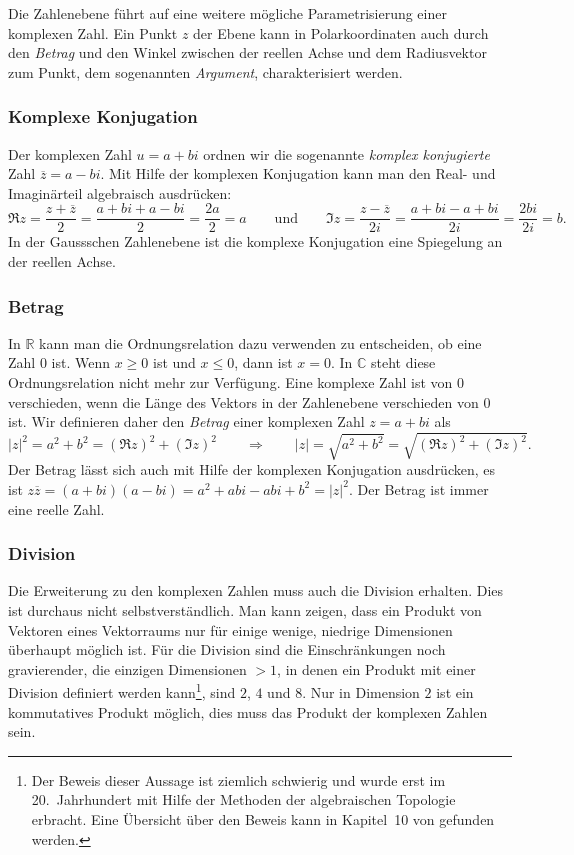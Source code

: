 Die Zahlenebene führt auf eine weitere mögliche Parametrisierung einer
komplexen Zahl.
Ein Punkt $z$ der Ebene kann in Polarkoordinaten auch durch den {\em Betrag}
%
%
und den Winkel zwischen der reellen Achse und dem Radiusvektor zum Punkt,
dem sogenannten {\em Argument},
charakterisiert werden.

\subsubsection{Komplexe Konjugation}
Der komplexen Zahl $u=a+bi$ ordnen wir die sogenannte
{\em komplex konjugierte} Zahl $\overline{z} = a-bi$.
Mit Hilfe der komplexen Konjugation kann man den Real- und Imaginärteil
%
%
algebraisch ausdrücken:
\[
\Re z 
=
\frac{z+\overline{z}}2
=
\frac{a+bi+a-bi}{2}
=
\frac{2a}2
=a
\qquad\text{und}\qquad
\Im z
=
\frac{z-\overline{z}}{2i}
=
\frac{a+bi-a+bi}{2i}
=
\frac{2bi}{2i}
=
b.
\]
In der Gaussschen Zahlenebene ist die komplexe Konjugation eine
Spiegelung an der reellen Achse.

\subsubsection{Betrag}
In $\mathbb{R}$ kann man die Ordnungsrelation dazu verwenden zu entscheiden,
ob eine Zahl $0$ ist. 
Wenn $x\ge 0$ ist und $x\le 0$, dann ist $x=0$.
In $\mathbb{C}$ steht diese Ordnungsrelation nicht mehr zur Verfügung.
Eine komplexe Zahl ist von $0$ verschieden, wenn die Länge des Vektors in der
Zahlenebene verschieden von $0$ ist.
Wir definieren daher den {\em Betrag} einer komplexen Zahl $z=a+bi$ als
\[
|z|^2
=
a^2 +b^2
=
(\Re z)^2 + (\Im z)^2
\qquad\Rightarrow\qquad
|z|
=
\sqrt{a^2+b^2}
=
\sqrt{(\Re z)^2 + (\Im z)^2}.
\]
Der Betrag lässt sich auch mit Hilfe der komplexen Konjugation ausdrücken,
es ist $z\overline{z} = (a+bi)(a-bi) = a^2+abi-abi+b^2 = |z|^2$.
Der Betrag ist immer eine reelle Zahl.

\subsubsection{Division}
Die Erweiterung zu den komplexen Zahlen muss auch die Division erhalten.
Dies ist durchaus nicht selbstverständlich.
Man kann zeigen, dass ein Produkt von Vektoren eines Vektorraums nur für
einige wenige, niedrige Dimensionen überhaupt möglich ist.
Für die Division sind die Einschränkungen noch gravierender, die einzigen
Dimensionen $>1$, in denen ein Produkt mit einer Division definiert werden
kann\footnote{Der Beweis dieser Aussage ist ziemlich schwierig und wurde
erst im 20.~Jahrhundert mit Hilfe der Methoden der algebraischen Topologie
erbracht. Eine Übersicht über den Beweis kann in Kapitel~10 von
\cite{buch:ebbinghaus} gefunden werden.}, sind $2$, $4$ und $8$.
Nur in Dimension $2$ ist ein kommutatives Produkt möglich, dies muss das
Produkt der komplexen Zahlen sein.

